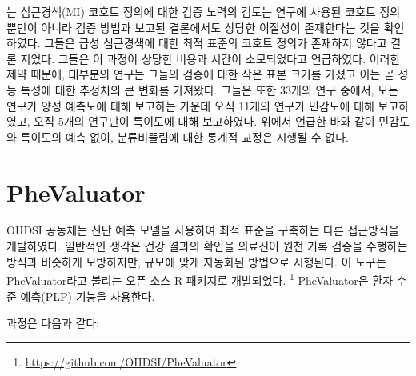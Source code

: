 \documentclass[10.5pt]{book}
\let\rmarkdownfootnote\footnote%
\def\footnote{\protect\rmarkdownfootnote}
\theoremstyle{definition}
\theoremstyle{definition}
\theoremstyle{definition}
\theoremstyle{remark}
\begin{document}
\citet{Rubbo2015phenotypes} 는 심근경색(MI) 코호트 정의에 대한 검증
노력의 검토는 연구에 사용된 코호트 정의뿐만이 아니라 검증 방법과 보고된
결론에서도 상당한 이질성이 존재한다는 것을 확인하였다. 그들은 급성
심근경색에 대한 최적 표준의 코호트 정의가 존재하지 않다고 결론 지었다.
그들은 이 과정이 상당한 비용과 시간이 소모되었다고 언급하였다. 이러한
제약 때문에, 대부분의 연구는 그들의 검증에 대한 작은 표본 크기를 가졌고
이는 곧 성능 특성에 대한 추정치의 큰 변화를 가져왔다. 그들은 또한 33개의
연구 중에서, 모든 연구가 양성 예측도에 대해 보고하는 가운데 오직 11개의
연구가 민감도에 대해 보고하였고, 오직 5개의 연구만이 특이도에 대해
보고하였다. 위에서 언급한 바와 같이 민감도와 특이도의 예측 없이,
분류비뚤림에 대한 통계적 교정은 시행될 수 없다.

\section{PheValuator}\label{phevaluator}


OHDSI 공동체는 진단 예측 모델을 사용하여 최적 표준을 구축하는 다른
접근방식을 개발하였다. \citep{Swerdel2019phevaluator} 일반적인 생각은
건강 결과의 확인을 의료진이 원천 기록 검증을 수행하는 방식과 비슷하게
모방하지만, 규모에 맞게 자동화된 방법으로 시행된다. 이 도구는
PheValuator라고 불리는 오픈 소스 R 패키지로 개발되었다. \footnote{\url{https://github.com/OHDSI/PheValuator}}
PheValuator은 환자 수준 예측(PLP) 기능을 사용한다.

과정은 다음과 같다:
\end{document}
